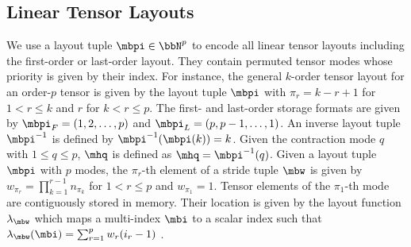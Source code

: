 \subsection{Linear Tensor Layouts}
\label{sec:preliminaries:layout}
We use a layout tuple $\mbpi \in \bbN^p$ to encode all linear tensor layouts including the first-order or last-order layout.
They contain permuted tensor modes whose priority is given by their index.
For instance, the general $k$-order tensor layout for an order-$p$ tensor is given by the layout tuple $\mbpi$ with $\pi_r = k-r+1$ for $1 < r \leq k$ and $r$ for $k < r \leq p$.
The first- and last-order storage formats are given by $\mbpi_F = (1,2,\dots,p)$ and $\mbpi_{L} = (p,p-1,\dots,1)$.
An inverse layout tuple $\mbpi^{-1}$ is defined by $\mbpi^{-1}(\mbpi(k)) = k$.
Given the contraction mode $q$ with $1 \leq q \leq p$, $\mhq$ is defined as $\mhq=\mbpi^{-1}(q)$.
Given a layout tuple $\mbpi$ with $p$ modes, the $\pi_r$-th element of a stride tuple $\mbw$ is given by $w_{\pi_r} = \prod_{k=1}^{r-1} n_{\pi_k}$ for $1 < r \leq p$ and $w_{\pi_1} = 1$.
Tensor elements of the $\pi_1$-th mode are contiguously stored in memory.
Their location is given by the layout function $\lambda_{\mbw}$ which maps a multi-index $\mbi$ to a scalar index such that $\lambda_{\mbw}(\mbi) = \sum_{r=1}^p w_{r} (i_{r}-1)$ \cite{bassoy:2018:fast}.

